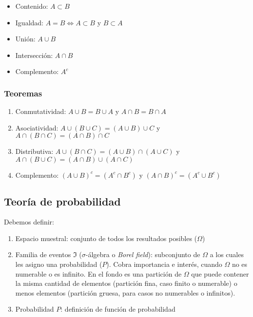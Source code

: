 \documentclass[]{article}
\providecommand{\tightlist}{%
  \setlength{\itemsep}{0pt}\setlength{\parskip}{0pt}}
\begin{document}
\begin{itemize}
\tightlist
\item
  Contenido: \(A \subset B\)
\item
  Igualdad: \(A = B \Leftrightarrow A \subset B\) y \(B \subset A\)
\item
  Unión: \(A \cup B\)
\item
  Intersección: \(A \cap B\)
\item
  Complemento: \(A^c\)
\end{itemize}

\subsubsection{Teoremas}\label{teoremas}

\begin{enumerate}
\def\labelenumi{\arabic{enumi}.}
\tightlist
\item
  Conmutatividad: \(A \cup B = B \cup A\) y \(A \cap B = B \cap A\)
\item
  Asociatividad: \(A \cup (B \cup C) = (A \cup B) \cup C\) y
  \(A \cap (B \cap C) = (A \cap B) \cap C\)
\item
  Distributiva: \(A \cup (B \cap C) = (A \cup B) \cap (A \cup C)\) y
  \(A \cap (B \cup C) = (A \cap B) \cup (A \cap C)\)
\item
  Complemento: \((A \cup B)^c = (A^c \cap B^c)\) y
  \((A \cap B)^c = (A^c \cup B^c)\)
\end{enumerate}

\subsection{Teoría de probabilidad}\label{teoria-de-probabilidad}

Debemos definir:

\begin{enumerate}
\def\labelenumi{\arabic{enumi}.}
\tightlist
\item
  Espacio muestral: conjunto de todos los resultados posibles
  (\(\Omega\))
\item
  Familia de eventos \(\Im\) (\(\sigma\)-álgebra o \emph{Borel field}):
  subconjunto de \(\Omega\) a los cuales les asigno una probabilidad
  (\(P\)). Cobra importancia e interés, cuando \(\Omega\) no es
  numerable o es infinito. En el fondo es una partición de \(\Omega\)
  que puede contener la misma cantidad de elementos (partición fina,
  caso finito o numerable) o menos elementos (partición gruesa, para
  casos no numerables o infinitos).
\item
  Probabilidad \(P\): definición de función de probabilidad
\end{enumerate}
\end{document}
